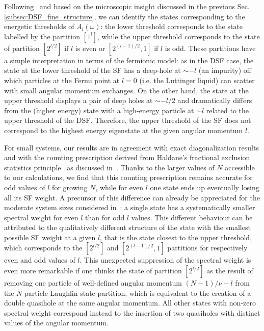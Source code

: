 \documentclass[twocolumn,pra,superscriptaddress,noshowpacs]{revtex4}
\begin{document}
Following~\cite{CooperSimon_PRL_2015} and based on the microscopic insight discussed in the previous Sec.\ref{subsec:DSF_fine_structure}, we can identify the states corresponding to the energetic thresholds of $A_l(\omega)$: 
the lower threshold corresponds to the state labelled by the partition $[1^l]$, while the upper threshold corresponds to the state of partition $[2^{l/2}]$ if $l$ is even or $[2^{(l-1)/2},1]$ if $l$ is odd. These partitions have a simple interpretation in terms of the fermionic model: as in the DSF case, the state at the lower threshold of the SF has a deep-hole at $\sim -l$ (an impurity) off which particles at the Fermi point at $l=0$ (i.e. the Luttinger liquid) can scatter with small angular momentum exchanges.
On the other hand, the state at the upper threshold displays a pair of deep holes at $\sim -l/2$ and dramatically differs from the (higher energy) state with a high-energy particle at $\sim l$ related to the upper threshold of the DSF. Therefore, the upper threshold of the SF does not correspond to the highest energy eigenstate at the given angular momentum $l$.

For small systems, our results are in agreement with exact diagonalization results and with the counting prescription derived from Haldane's fractional exclusion statistics principle~\cite{Haldane_PRL_1991,BernevigHaldane_PRL_2008} as discussed in~\cite{CooperSimon_PRL_2015}. Thanks to the larger values of $N$ accessible to our calculations, we find that this counting prescription remains accurate for odd values of $l$ for growing $N$, while for even $l$ one state ends up eventually losing all its SF weight.
A precursor of this difference can already be appreciated for the moderate system sizes considered in~\cite{CooperSimon_PRL_2015}: a single state has a systematically smaller spectral weight for even $l$ than for odd $l$ values. %
This different behaviour can be attributed to the qualitatively different structure of the state with the smallest possible SF weight at a given $l$, that is the state closest to the upper threshold, which corresponds to the $[2^{l/2}]$ and $[2^{(l-1)/2},1]$ partitions for respectively even and odd values of $l$. 
This unexpected suppression of the spectral weight is even more remarkable if one thinks the state of partition $[2^{l/2}]$ as the result of removing one particle of well-defined angular momentum $(N-1)/\nu-l$ from the $N$ particle Laughlin state partition, which is equivalent to the creation of a double quasihole at the same angular momentum. All other states with non-zero spectral weight correspond instead to the insertion of two quasiholes with distinct values of the angular momentum.
\end{document}
